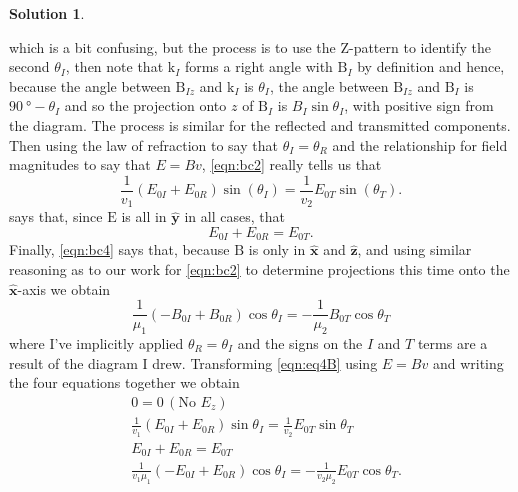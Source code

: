 \documentclass[10pt]{article}
\theoremstyle{definition}
\newtheorem{soln}{Solution}
\newcommand{\ux}{\hat{\mathbf{x}}}
\newcommand{\uy}{\hat{\mathbf{y}}}
\newcommand{\uz}{\hat{\mathbf{z}}}
\newcommand{\bv}[1]{\bm{\mathrm{#1}}}
\begin{document}
\begin{soln}
\begin{center}
  \end{center}
  which is a bit confusing, but the process is to use the Z-pattern to identify the second $\theta_I$, then note that $\bv{k}_I$ forms a right angle
  with $\bv{B}_I$ by definition and hence, because the angle between $\bv{B}_{Iz}$ and $\bv{k}_I$ is $\theta_I$, the angle between $\bv{B}_{Iz}$ and
  $\bv{B}_{I}$ is $\qty{90}{\degree}-\theta_I$ and so the projection onto $z$ of $\bv{B}_I$ is $B_I\sin\theta_I$, with positive sign from the diagram.
  The process is similar for the reflected and transmitted components. Then using the law of refraction to say that $\theta_I=\theta_R$ and
  the relationship for field magnitudes to say that $E=Bv$, \cref{eqn:bc2} really tells us that
  $$\frac{1}{v_1}\left(E_{0I}+E_{0R}\right)\sin(\theta_I)=\frac{1}{v_2}E_{0T}\sin(\theta_T).$$
   says that, since $\bv{E}$ is all in $\uy$ in all cases, that
  $$E_{0I}+E_{0R} = E_{0T}.$$
  Finally, \cref{eqn:bc4} says that, because $\bv{B}$ is only in $\ux$ and $\uz$, and using similar reasoning as to our work for \cref{eqn:bc2}
  to determine projections this time onto the $\ux$-axis we obtain
  \begin{equation}
    \frac{1}{\mu_1}(-B_{0I}+B_{0R})\cos\theta_I =-\frac{1}{\mu_2}B_{0T}\cos\theta_T \label{eqn:eq4B}
  \end{equation}
  where I've implicitly applied $\theta_R=\theta_I$ and the signs on the $I$ and $T$ terms are a result of the diagram I drew. Transforming
  \cref{eqn:eq4B} using $E=Bv$ and writing the four equations together we obtain
  \begin{align*}
     & 0=0\, (\text{No $E_z$})                                                                \\
     & \frac{1}{v_1}\left(E_{0I}+E_{0R}\right)\sin\theta_I=\frac{1}{v_2}E_{0T}\sin\theta_T    \\
     & E_{0I}+E_{0R} = E_{0T}                                                                 \\
     & \frac{1}{v_1\mu_1}(-E_{0I}+E_{0R})\cos\theta_I =-\frac{1}{v_2\mu_2}E_{0T}\cos\theta_T.
  \end{align*}
\end{soln}
\newpage
\end{document}
